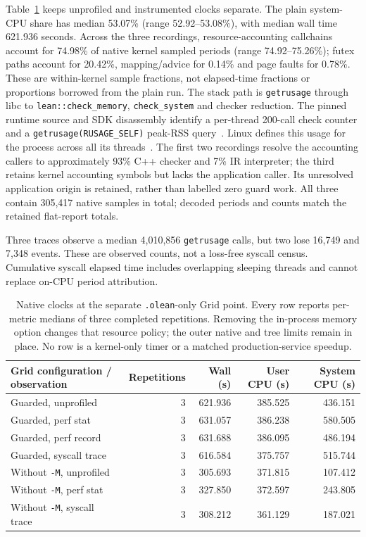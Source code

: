 \documentclass[10pt,twocolumn]{article}
\begin{document}
Table~\ref{tab:grid-guard-accounting} keeps unprofiled and instrumented clocks
separate. The plain system-CPU share has median 53.07\%
(range 52.92--53.08\%), with median wall time 621.936 seconds.
Across the three recordings, resource-accounting callchains account for
74.98\% of native kernel sampled periods (range 74.92--75.26\%);
futex paths account for 20.42\%, mapping/advice for 0.14\% and page faults
for 0.78\%. These are within-kernel sample fractions, not elapsed-time
fractions or proportions borrowed from the plain run.
The stack path is \texttt{getrusage} through libc to
\texttt{lean::check\_memory}, \texttt{check\_system} and checker reduction.
The pinned runtime source and SDK disassembly identify a per-thread
200-call check counter and a \texttt{getrusage(RUSAGE\_SELF)} peak-RSS
query~\cite{leanMemoryGuard2026}.
Linux defines this usage for the process across all its
threads~\cite{linuxGetrusage2026}.
The first two recordings resolve the accounting callers to approximately
93\% C++ checker and 7\% IR interpreter; the third retains kernel
accounting symbols but lacks the application caller.
Its unresolved application origin is retained, rather than labelled zero
guard work. All three contain 305,417 native samples in total; decoded
periods and counts match the retained flat-report totals.

Three traces observe a median 4,010,856 \texttt{getrusage} calls, but two
lose 16,749 and 7,348 events. These are observed counts, not a loss-free
syscall census. Cumulative syscall elapsed time includes overlapping
sleeping threads and cannot replace on-CPU period attribution.

\begin{table}[t]
\centering\small
\begin{tabular}{lrrrr}
\toprule
Grid configuration / observation & Repetitions & Wall (s) & User CPU (s) & System CPU (s)\\
\midrule
Guarded, unprofiled &3&621.936&385.525&436.151\\
Guarded, perf stat &3&631.057&386.238&580.505\\
Guarded, perf record &3&631.688&386.095&486.194\\
Guarded, syscall trace &3&616.584&375.757&515.744\\
Without \texttt{-M}, unprofiled &3&305.693&371.815&107.412\\
Without \texttt{-M}, perf stat &3&327.850&372.597&243.805\\
Without \texttt{-M}, syscall trace &3&308.212&361.129&187.021\\
\bottomrule
\end{tabular}
\caption{Native clocks at the separate \texttt{.olean}-only Grid point.
Every row reports per-metric medians of three completed repetitions.
Removing the in-process memory option changes that resource policy;
the outer native and tree limits remain in place.
No row is a kernel-only timer or a matched production-service speedup.}
\label{tab:grid-guard-accounting}
\end{table}
\end{document}

